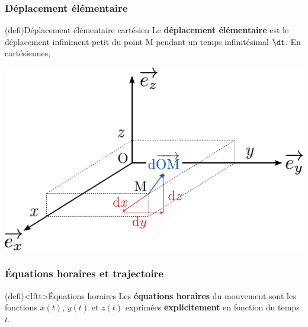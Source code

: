 \documentclass[../../main/main.tex]{subfiles}
\begin{document}
\subsubsection{Déplacement élémentaire}
\begin{tcb}[sidebyside, righthand ratio=.35](defi){Déplacement élémentaire
			cartésien}
	Le \textbf{déplacement élémentaire} est le déplacement infiniment petit du
	point M pendant un temps infinitésimal $\dt$. En cartésiennes,
	\vspace{-15pt}
	\tcblower
	\begin{center}
		\includegraphics[width=\linewidth]{dOM_cart}
		\captionsetup{justification=centering}
	\end{center}
\end{tcb}

\subsubsection{Équations horaires et trajectoire}
\begin{tcb}(defi)<lftt>{Équations horaires}
	Les \textbf{équations horaires} du mouvement sont les fonctions $x(t)$,
	$y(t)$ et $z(t)$ exprimées \textbf{explicitement} en fonction du temps $t$.
\end{tcb}
\end{document}
